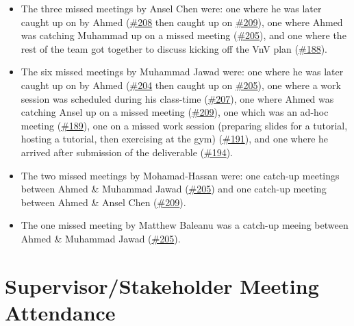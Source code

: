\documentclass{article}
\begin{document}
\begin{itemize}
    \item The three missed meetings by Ansel Chen were: one where he was later caught up on by Ahmed (\href{https://github.com/AhmedAl-Hayali/GenreGuru/issues/208}{\#208} then caught up on \href{https://github.com/AhmedAl-Hayali/GenreGuru/issues/209}{\#209}), one where Ahmed was catching Muhammad up on a missed meeting (\href{https://github.com/AhmedAl-Hayali/GenreGuru/issues/205}{\#205}), and one where the rest of the team got together to discuss kicking off the VnV plan (\href{https://github.com/AhmedAl-Hayali/GenreGuru/issues/188}{\#188}).
    \item The six missed meetings by Muhammad Jawad were: one where he was later caught up on by Ahmed (\href{https://github.com/AhmedAl-Hayali/GenreGuru/issues/204}{\#204} then caught up on \href{https://github.com/AhmedAl-Hayali/GenreGuru/issues/205}{\#205}), one where a work session was scheduled during his class-time (\href{https://github.com/AhmedAl-Hayali/GenreGuru/issues/207}{\#207}), one where Ahmed was catching Ansel up on a missed meeting (\href{https://github.com/AhmedAl-Hayali/GenreGuru/issues/209}{\#209}), one which was an ad-hoc meeting (\href{https://github.com/AhmedAl-Hayali/GenreGuru/issues/189}{\#189}), one on a missed work session (preparing slides for a tutorial, hosting a tutorial, then exercising at the gym) (\href{https://github.com/AhmedAl-Hayali/GenreGuru/issues/191}{\#191}), and one where he arrived after submission of the deliverable (\href{https://github.com/AhmedAl-Hayali/GenreGuru/issues/194}{\#194}).
    \item The two missed meetings by Mohamad-Hassan were: one catch-up meetings between Ahmed \& Muhammad Jawad (\href{https://github.com/AhmedAl-Hayali/GenreGuru/issues/205}{\#205}) and one catch-up meeting between Ahmed \& Ansel Chen (\href{https://github.com/AhmedAl-Hayali/GenreGuru/issues/209}{\#209}).
    \item The one missed meeting by Matthew Baleanu was a catch-up meeing between Ahmed \& Muhammad Jawad (\href{https://github.com/AhmedAl-Hayali/GenreGuru/issues/205}{\#205}).
\end{itemize}

\newpage
\section{Supervisor/Stakeholder Meeting Attendance}

\end{document}
